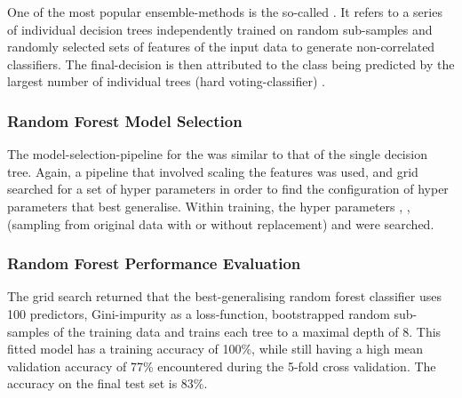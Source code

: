 One of the most popular ensemble-methods is the so-called . It refers to a series of individual decision trees  independently trained on random sub-samples and randomly selected sets of features of the input data to generate non-correlated classifiers. The final-decision is then attributed to the class being predicted by the largest number of individual trees (hard voting-classifier) \cite{introStats}.

\subsubsection{Random Forest Model Selection}
The model-selection-pipeline for the  was similar to that of the single decision tree. Again, a pipeline that involved scaling the features was used, and grid searched for a set of hyper parameters in order to find the configuration of hyper parameters that best generalise. Within training, the hyper parameters , ,  (sampling from original data with or without replacement) and  were searched.
\newline 

\subsubsection{Random Forest Performance Evaluation}
The grid search returned that the best-generalising random forest classifier uses 100 predictors, Gini-impurity as a loss-function, bootstrapped random sub-samples of the training data and trains each tree to a maximal depth of 8. This fitted model has a training accuracy of 100\%, while still having a high mean validation accuracy of 77\% encountered during the 5-fold cross validation. The accuracy on the final test set is 83\%. 

